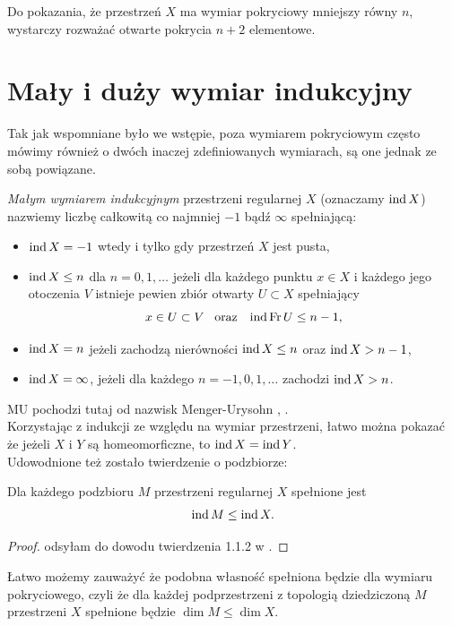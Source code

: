 \begin{wnio}
    Do pokazania, że przestrzeń $X$ ma wymiar pokryciowy mniejszy równy $n$, wystarczy rozważać otwarte pokrycia $n+2$ elementowe.
\end{wnio}

\section{Mały i duży wymiar indukcyjny}
Tak jak wspomniane było we wstępie, poza wymiarem pokryciowym często mówimy również o dwóch inaczej zdefiniowanych wymiarach, są one jednak ze sobą powiązane.

\begin{defi}
    \emph{Małym wymiarem indukcyjnym} przestrzeni regularnej $X$ (oznaczamy $\operatorname{ind}  X$) nazwiemy liczbę całkowitą co najmniej $-1$ bądź $\infty$ spełniającą:
    \begin{itemize}
        \item[(MU1)] $\operatorname{ind} X = -1$ wtedy i tylko gdy przestrzeń $X$ jest pusta,
        \item[(MU2)] $\operatorname{ind} X\le n$ dla $n=0,1,\ldots$ jeżeli dla każdego punktu $x\in X$ i każdego jego otoczenia $V$ istnieje pewien zbiór otwarty $U\subset X$ spełniający
        \[x\in U\subset V\;\;\;\mathrm{oraz}\;\;\; \operatorname{ind} \operatorname{Fr} U \le n-1,\]
        \item[(MU3)] $\operatorname{ind} X=n$ jeżeli zachodzą nierówności $\operatorname{ind} X\leq n$ oraz $\operatorname{ind} X> n-1$,
        \item[(MU4)] $\operatorname{ind} X=\infty$, jeżeli dla każdego $n=-1,0,1,\ldots$ zachodzi $\operatorname{ind} X >n$.
    \end{itemize}
\end{defi}
MU pochodzi tutaj od nazwisk Menger-Urysohn \cite{menger1923}, \cite{urysohn1922}. \\
Korzystając z indukcji ze względu na wymiar przestrzeni, łatwo można pokazać że jeżeli $X$ i $Y$ są homeomorficzne, to $\operatorname{ind} X=\operatorname{ind} Y$. \\
Udowodnione też zostało twierdzenie o podzbiorze:
\begin{twie}
    Dla każdego podzbioru $M$ przestrzeni regularnej $X$ spełnione jest 
    \[\operatorname{ind} M\le \operatorname{ind} X.\]
\end{twie}
\begin{proof}
    odsyłam do dowodu twierdzenia 1.1.2 w \cite{engelking1995}.
\end{proof}
Łatwo możemy zauważyć że podobna własność spełniona będzie dla wymiaru pokryciowego, czyli że dla każdej podprzestrzeni z topologią dziedziczoną $M$ przestrzeni $X$ spełnione będzie $\dim M\le \dim X$.

